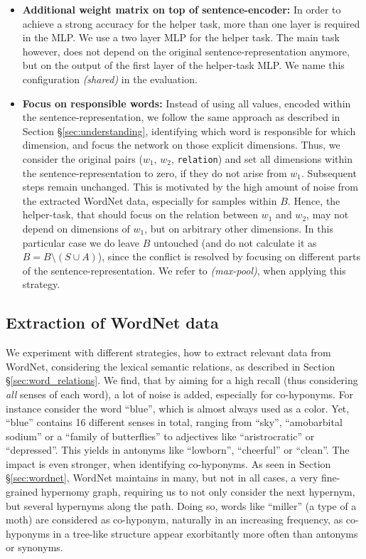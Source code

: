 \begin{itemize}
\item \textbf{Additional weight matrix on top of sentence-encoder:} In order to achieve a strong accuracy for the helper task, more than one layer is required in the \ac{MLP}. We use a two layer \ac{MLP} for the helper task. The main task however, does not depend on the original sentence-representation anymore, but on the output of the first layer of the helper-task \ac{MLP}. We name this configuration \textit{(shared)} in the evaluation.
\item \textbf{Focus on responsible words:} Instead of using all values, encoded within the sentence-representation, we follow the same approach as described in Section §\ref{sec:understanding}, identifying which word is responsible for which dimension, and focus the network on those explicit dimensions. Thus, we consider the original pairs ($w_1$, $w_2$, \texttt{relation}) and set all dimensions within the sentence-representation to zero, if they do not arise from $w_1$. Subsequent steps remain unchanged. This is motivated by the high amount of noise from the extracted WordNet data, especially for samples within $B$. Hence, the helper-task, that should focus on the relation between $w_1$ and $w_2$, may not depend on dimensions of $w_1$, but on arbitrary other dimensions. In this particular case we do leave $B$ untouched (and do not calculate it as $B  = B \setminus (S \cup A)$), since the conflict is resolved by focusing on different parts of the sentence-representation. We refer to \textit{(max-pool)}, when applying this strategy.
\end{itemize}
\subsection{Extraction of WordNet data}
We experiment with different strategies, how to extract relevant data from WordNet, considering the lexical semantic relations, as described in Section §\ref{sec:word_relations}. We find, that by aiming for a high recall (thus considering \textit{all} senses of each word), a lot of noise is added, especially for co-hyponyms. For instance consider the word ``blue'', which is almost always used as a color. Yet, ``blue'' contains 16 different senses in total, ranging from ``sky'', ``amobarbital sodium'' or a ``family of butterflies'' to adjectives like ``aristrocratic'' or ``depressed''. This yields in antonyms like  ``lowborn'', ``cheerful'' or ``clean''. The impact is even stronger, when identifying co-hyponyms. As seen in Section §\ref{sec:wordnet}, WordNet maintains in many, but not in all cases, a very fine-grained hypernomy graph, requiring us to not only consider the next hypernym, but several hypernyms along the path. Doing so, words like ``miller'' (a type of a moth) are considered as co-hyponym, naturally in an increasing frequency, as co-hyponyms in a tree-like structure appear exorbitantly more often than antonyms or synonyms.


